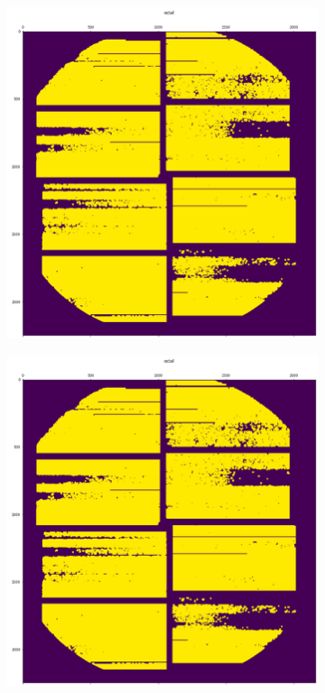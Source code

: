 \begin{figure}
	\centering
	\begin{subfigure}{0.45\textwidth}
		\includegraphics[width=\linewidth]{images/mask.png}
	\end{subfigure}
	\begin{subfigure}{0.45\textwidth}
		\includegraphics[width=\linewidth]{images/mask.png}

\end{subfigure}
\end{figure}
